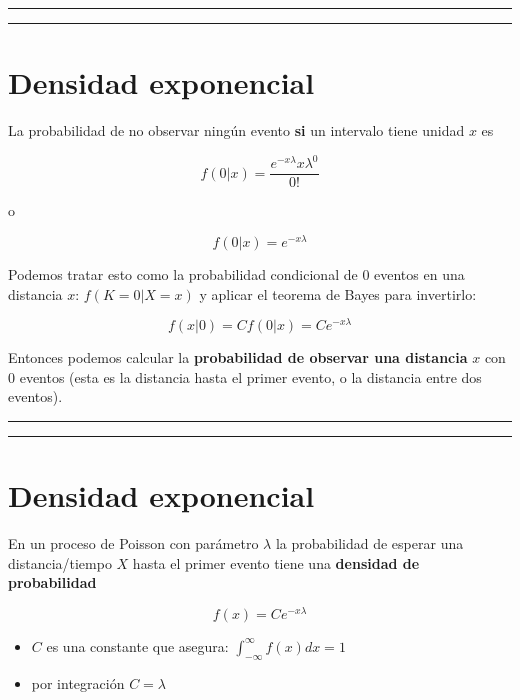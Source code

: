 \documentclass[
]{book}
\begin{document}
\begin{center}\rule{0.5\linewidth}{0.5pt}\end{center}

\begin{center}\rule{0.5\linewidth}{0.5pt}\end{center}

\hypertarget{densidad-exponencial-1}{%
\section{Densidad exponencial}\label{densidad-exponencial-1}}

La probabilidad de no observar ningún evento \textbf{si} un intervalo tiene unidad \(x\) es

\[f(0|x)=\frac{e^{-x\lambda}x\lambda^0}{0!}\]

o

\[f(0|x)=e^{-x\lambda}\]

Podemos tratar esto como la probabilidad condicional de \(0\) eventos en una distancia \(x\): \(f(K=0|X=x)\) y aplicar el teorema de Bayes para invertirlo:

\[f(x|0)=C f(0|x)=C e^{-x\lambda}\]

Entonces podemos calcular la \textbf{probabilidad de observar una distancia} \(x\) con \(0\) eventos (esta es la distancia hasta el primer evento, o la distancia entre dos eventos).

\begin{center}\rule{0.5\linewidth}{0.5pt}\end{center}

\begin{center}\rule{0.5\linewidth}{0.5pt}\end{center}

\hypertarget{densidad-exponencial-2}{%
\section{Densidad exponencial}\label{densidad-exponencial-2}}

En un proceso de Poisson con parámetro \(\lambda\) la probabilidad de esperar una distancia/tiempo \(X\) hasta el primer evento tiene una \textbf{densidad de probabilidad}

\[f(x)= C e^{-x\lambda}\]

\begin{itemize}
\item
  \(C\) es una constante que asegura: \(\int_{-\infty}^{\infty} f(x) dx =1\)
\item
  por integración \(C=\lambda\)
\end{itemize}
\end{document}
